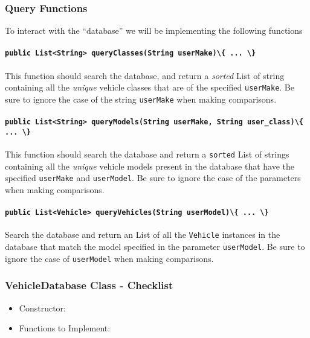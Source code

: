 \subsubsection{Query Functions}

To interact with the ``database'' we will be implementing the following functions 

\paragraph{\lstinline|public List<String> queryClasses(String
userMake)\{ ... \}|} This function should  search the database, and return a
\textit{sorted} List of string containing all the \textit{unique} vehicle
classes that are of the specified \lstinline|userMake|. Be sure to ignore the
case of the string \lstinline|userMake| when making comparisons.

\paragraph{\lstinline|public List<String> queryModels(String userMake,
String user_class)\{ ... \}|} This function should search the database and return a
\lstinline{sorted} List of strings containing all the \textit{unique}
vehicle models present in the database that have the specified
\lstinline|userMake| and \lstinline|userModel|. Be sure to ignore the case of
the parameters when making comparisons.

\paragraph{\lstinline|public List<Vehicle> queryVehicles(String
userModel)\{ ... \}|} Search the database and return an List of all the
\lstinline|Vehicle| instances in the database that match the model specified in
the parameter \lstinline|userModel|. Be sure to ignore the case of
\lstinline|userModel| when making comparisons.

\subsubsection{VehicleDatabase Class - Checklist}
\begin{itemize}
    \item Constructor: 
    \item Functions to Implement: 
\end{itemize}

